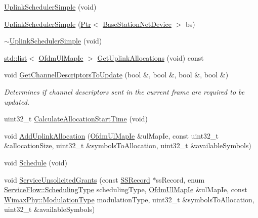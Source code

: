 \begin{DoxyCompactItemize}
\item 
\hyperlink{classns3_1_1UplinkSchedulerSimple_a25b347f80fb5729b6e439f017dee9031}{Uplink\+Scheduler\+Simple} (void)
\item 
\hyperlink{classns3_1_1UplinkSchedulerSimple_a54305a726288dde444d3d21c215c5515}{Uplink\+Scheduler\+Simple} (\hyperlink{classns3_1_1Ptr}{Ptr}$<$ \hyperlink{classns3_1_1BaseStationNetDevice}{Base\+Station\+Net\+Device} $>$ bs)
\item 
\hyperlink{classns3_1_1UplinkSchedulerSimple_adbf77197f0dd8c8a37ae2446759c4761}{$\sim$\+Uplink\+Scheduler\+Simple} (void)
\item 
\hyperlink{openflow-interface_8h_afd9bcfa176617760671b67580f536fa7}{std\+::list}$<$ \hyperlink{classns3_1_1OfdmUlMapIe}{Ofdm\+Ul\+Map\+Ie} $>$ \hyperlink{classns3_1_1UplinkSchedulerSimple_a8bb843591afbf1d05891a1394674a42b}{Get\+Uplink\+Allocations} (void) const 
\item 
void \hyperlink{classns3_1_1UplinkSchedulerSimple_ae2e28db89d928dbd6e0b1795d21a2393}{Get\+Channel\+Descriptors\+To\+Update} (bool \&, bool \&, bool \&, bool \&)
\begin{DoxyCompactList}\small\item\em Determines if channel descriptors sent in the current frame are required to be updated. \end{DoxyCompactList}\item 
uint32\+\_\+t \hyperlink{classns3_1_1UplinkSchedulerSimple_a51027095bc6bc9487e2203f532f2ee9d}{Calculate\+Allocation\+Start\+Time} (void)
\item 
void \hyperlink{classns3_1_1UplinkSchedulerSimple_a078c18f311ce90cbceab11a54cd4606e}{Add\+Uplink\+Allocation} (\hyperlink{classns3_1_1OfdmUlMapIe}{Ofdm\+Ul\+Map\+Ie} \&ul\+Map\+Ie, const uint32\+\_\+t \&allocation\+Size, uint32\+\_\+t \&symbols\+To\+Allocation, uint32\+\_\+t \&available\+Symbols)
\item 
void \hyperlink{classns3_1_1UplinkSchedulerSimple_a227a6c6e858bcff7dc626064d12df9df}{Schedule} (void)
\item 
void \hyperlink{classns3_1_1UplinkSchedulerSimple_ab30024e72d773b5d0838b7d2222c8a1d}{Service\+Unsolicited\+Grants} (const \hyperlink{classns3_1_1SSRecord}{S\+S\+Record} $\ast$ss\+Record, enum \hyperlink{classns3_1_1ServiceFlow_a7990ba10be1e098328fd1e6382a26235}{Service\+Flow\+::\+Scheduling\+Type} scheduling\+Type, \hyperlink{classns3_1_1OfdmUlMapIe}{Ofdm\+Ul\+Map\+Ie} \&ul\+Map\+Ie, const \hyperlink{classns3_1_1WimaxPhy_a044c5d8a48ca992c39c2a946f6e755fa}{Wimax\+Phy\+::\+Modulation\+Type} modulation\+Type, uint32\+\_\+t \&symbols\+To\+Allocation, uint32\+\_\+t \&available\+Symbols)

\end{DoxyCompactItemize}
